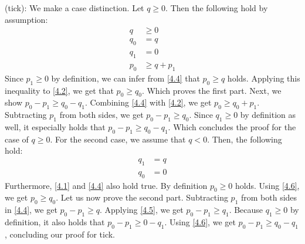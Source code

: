 (tick): We make a case distinction. Let \(q \geq 0\). Then the following hold by assumption:
\begin{align}
   q     &\geq 0 \label{4.1}\\
   q_0   &= q \label{4.2}\\
   q_1   &= 0 \label{4.3}\\
   p_0   &\geq q + p_1 \label{4.4}
\end{align}
Since \(p_1 \geq 0\) by definition, we can infer from \ref{4.4} that \(p_0 \geq q\) holds. Applying this inequality to \ref{4.2}, we get that \(p_0 \geq q_0\). Which proves the first part.
Next, we show \(p_0 - p_1 \geq q_0 - q_1\). Combining \ref{4.4} with \ref{4.2}, we get \(p_0 \geq q_0 + p_1\). Subtracting \(p_1\) from both sides, we get \(p_0 - p_1 \geq q_0\). Since \(q_1 \geq 0\) by definition as well, it especially holds that \(p_0 - p_1 \geq q_0 - q_1\). Which concludes the proof for the case of \(q \geq 0\).
For the second case, we assume that \(q < 0\). Then, the following hold:
\begin{align}
   q_1   &= q \label{4.5}\\
   q_0   &= 0 \label{4.6}
\end{align}
Furthermore, \ref{4.1} and \ref{4.4} also hold true. By definition \(p_0 \geq 0\) holds. Using \ref{4.6}, we get \(p_0 \geq q_0\). 
Let us now prove the second part. Subtracting \(p_1\) from both sides in \ref{4.4}, we get \(p_0 - p_1 \geq q \). Applying \ref{4.5}, we get \(p_0 - p_1 \geq q_1\). Because \(q_1 \geq 0\) by definition, it also holds that \(p_0 - p_1 \geq 0 - q_1\). Using \ref{4.6}, we get \(p_0 - p_1 \geq q_0 - q_1\), concluding our proof for tick.
   
